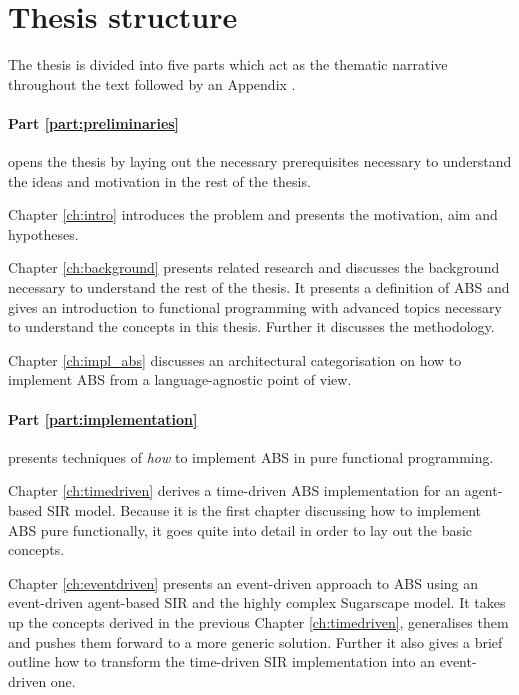 \section{Thesis structure}

The thesis is divided into five parts which act as the thematic narrative throughout the text followed by an Appendix . 

\paragraph{Part \ref{part:preliminaries}} opens the thesis by laying out the necessary prerequisites necessary to understand the ideas and motivation in the rest of the thesis.
\medskip

Chapter \ref{ch:intro} introduces the problem and presents the motivation, aim and hypotheses.

\medskip

Chapter \ref{ch:background} presents related research and discusses the background necessary to understand the rest of the thesis. It presents a definition of ABS and gives an introduction to functional programming with advanced topics necessary to understand the concepts in this thesis. Further it discusses the methodology.

\medskip

Chapter \ref{ch:impl_abs} discusses an architectural categorisation on how to implement ABS from a language-agnostic point of view. 

\medskip

\paragraph{Part \ref{part:implementation}} presents techniques of \textit{how} to implement ABS in pure functional programming. 
\medskip

Chapter \ref{ch:timedriven} derives a time-driven ABS implementation for an agent-based SIR model. Because it is the first chapter discussing how to implement ABS pure functionally, it goes quite into detail in order to lay out the basic concepts.

\medskip

Chapter \ref{ch:eventdriven} presents an event-driven approach to ABS using an event-driven agent-based SIR and the highly complex Sugarscape model. It takes up the concepts derived in the previous Chapter \ref{ch:timedriven}, generalises them and pushes them forward to a more generic solution. Further it also gives a brief outline how to transform the time-driven SIR implementation into an event-driven one.

